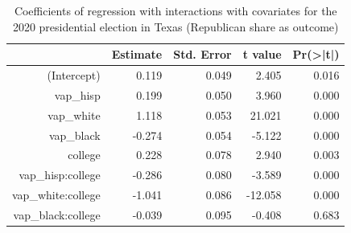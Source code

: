 \begin{table}[ht]
\centering
\begin{tabular}{rrrrr}
  \hline
 & Estimate & Std. Error & t value & Pr(>|t|) \\ 
  \hline
(Intercept) & 0.119 & 0.049 & 2.405 & 0.016 \\ 
  vap\_hisp & 0.199 & 0.050 & 3.960 & 0.000 \\ 
  vap\_white & 1.118 & 0.053 & 21.021 & 0.000 \\ 
  vap\_black & -0.274 & 0.054 & -5.122 & 0.000 \\ 
  college & 0.228 & 0.078 & 2.940 & 0.003 \\ 
  vap\_hisp:college & -0.286 & 0.080 & -3.589 & 0.000 \\ 
  vap\_white:college & -1.041 & 0.086 & -12.058 & 0.000 \\ 
  vap\_black:college & -0.039 & 0.095 & -0.408 & 0.683 \\ 
   \hline
\end{tabular}
\caption{Coefficients of regression with interactions with covariates for the 2020 presidential election in Texas (Republican share as outcome)} 
\label{tab:interaction-regression-texas}
\end{table}
